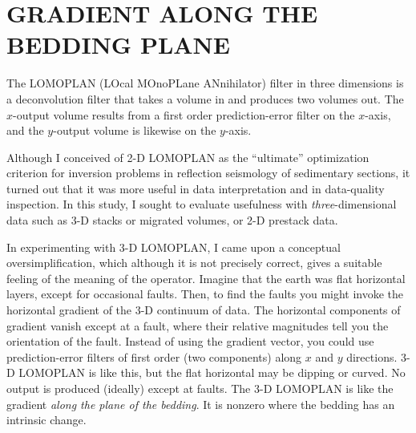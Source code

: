 
\section{GRADIENT ALONG THE BEDDING PLANE}
\par
The LOMOPLAN (LOcal MOnoPLane ANnihilator) filter
in three dimensions is a deconvolution filter that takes a volume in
and produces two volumes out.
The $x$-output volume results from a first order
prediction-error filter on the $x$-axis,
and the $y$-output volume is likewise on the $y$-axis.

\par
Although
I conceived of 2-D LOMOPLAN as the ``ultimate'' optimization criterion
for inversion problems in reflection seismology of sedimentary sections,
it turned out that it was more useful in data interpretation
and in data-quality inspection.
In this study, I sought to evaluate usefulness with
{\it three}-dimensional data
such as 3-D stacks or migrated volumes, or 2-D prestack data.

\par
In experimenting with 3-D LOMOPLAN,
I came upon a conceptual oversimplification,
which although it is not precisely correct,
gives a suitable feeling of the meaning of the operator.
Imagine that the earth was flat horizontal layers, except for occasional faults.
Then, to find the faults you might invoke the horizontal
gradient of the 3-D continuum of data.
The horizontal components of gradient vanish except at a fault,
where their relative magnitudes tell you the orientation of the fault.
Instead of using the gradient vector,
you could use prediction-error filters of first order (two components)
along $x$ and $y$ directions.
3-D LOMOPLAN is like this,
but the flat horizontal  may be dipping or curved.
No output is produced (ideally) except at faults.
The 3-D LOMOPLAN is like the gradient
{\it along the plane of the bedding}.
It is nonzero where the bedding has an intrinsic change.

\par\noindent
{}

